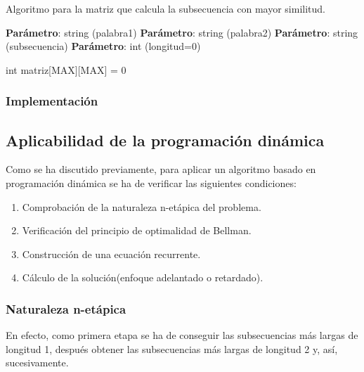 \begin{algorithm}[H]
  \caption{Algoritmo para la matriz que calcula la subsecuencia con mayor similitud.}\label{alg:simil}
  \begin{minipage}{0.92\textwidth}
  \textbf{Parámetro}: string (palabra1)
  \textbf{Parámetro}: string (palabra2)
  \textbf{Parámetro}: string (subsecuencia)
  \textbf{Parámetro}: int (longitud=0)
  \end{minipage}

  int matriz[MAX][MAX] = {0}

   {
     {
    }
  }


\end{algorithm}

\subsubsection{Implementación}


\subsection{Aplicabilidad de la programación dinámica}

Como se ha discutido previamente, para aplicar un algoritmo basado en programación
dinámica se ha de verificar las siguientes condiciones:

\begin{enumerate}
    \item Comprobación de la naturaleza n-etápica del problema. 
    \item Verificación del principio de optimalidad de Bellman. 
    \item Construcción de una ecuación recurrente. 
    \item Cálculo de la solución(enfoque adelantado o retardado). 
\end{enumerate}

\subsubsection{Naturaleza n-etápica}
En efecto, 
como primera etapa se ha de conseguir las subsecuencias más largas de longitud 1, 
después obtener las subsecuencias más largas de longitud 2 y, así, sucesivamente. 


